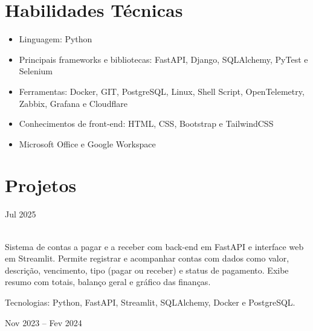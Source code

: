 \documentclass{cv}
\begin{document}
\pagestyle{empty}

\maketitle

\section{Habilidades Técnicas}

\vspace{0.15cm}

\begin{itemize}
  \item Linguagem: Python
  \item Principais frameworks e bibliotecas: FastAPI, Django, SQLAlchemy, PyTest e Selenium
  \item Ferramentas: Docker, GIT, PostgreSQL, Linux, Shell Script, OpenTelemetry, Zabbix, Grafana e Cloudflare
  \item Conhecimentos de front-end: HTML, CSS, Bootstrap e TailwindCSS
  \item Microsoft Office e Google Workspace
\end{itemize}

\section{Projetos}

\hfill{Jul 2025}\\
\\
\vspace{0.15cm}

Sistema de contas a pagar e a receber com back-end em FastAPI e interface web em Streamlit.
Permite registrar e acompanhar contas com dados como valor, descrição, vencimento, tipo
(pagar ou receber) e status de pagamento. Exibe resumo com totais, balanço geral e gráfico das finanças.

\vspace{0.08cm}

Tecnologias: Python, FastAPI, Streamlit, SQLAlchemy, Docker e PostgreSQL.

\hfill{Nov 2023 -- Fev 2024}\\
\\
\vspace{0.15cm}
\end{document}
